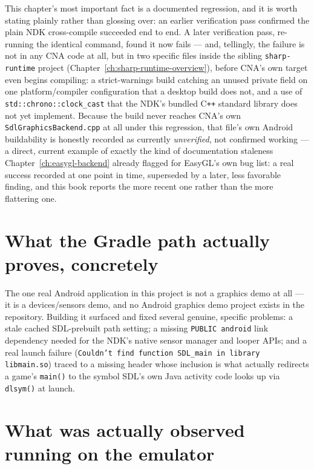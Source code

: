 This chapter's most important fact is a documented regression, and it is worth stating
plainly rather than glossing over: an earlier verification pass confirmed the plain
NDK cross-compile succeeded end to end. A later verification pass, re-running the identical
command, found it now fails --- and, tellingly, the failure is not in any CNA code at all,
but in two specific files inside the sibling \texttt{sharp-runtime} project
(Chapter~\ref{ch:sharp-runtime-overview}), before CNA's own target even begins compiling: a
strict-warnings build catching an unused private field on one platform/compiler
configuration that a desktop build does not, and a use of
\texttt{std::chrono::clock\_cast} that the NDK's bundled C\texttt{++} standard library does
not yet implement. Because the build never reaches CNA's own \texttt{SdlGraphicsBackend.cpp}
at all under this regression, that file's own Android buildability is honestly recorded as
currently \emph{unverified}, not confirmed working --- a direct, current example of exactly
the kind of documentation staleness Chapter~\ref{ch:easygl-backend} already flagged for
EasyGL's own bug list: a real success recorded at one point in time, superseded by a later,
less favorable finding, and this book reports the more recent one rather than the more
flattering one.

\section{What the Gradle path actually proves, concretely}

The one real Android application in this project is not a graphics demo at all --- it is a
devices/sensors demo, and no Android graphics demo project exists in the repository. Building
it surfaced and fixed several genuine, specific problems: a stale cached SDL-prebuilt path
setting; a missing \texttt{PUBLIC android} link dependency needed for the NDK's native sensor
manager and looper APIs; and a real launch failure (\texttt{Couldn't find function SDL\_main
in library libmain.so}) traced to a missing header whose inclusion is what actually redirects
a game's \texttt{main()} to the symbol SDL's own Java activity code looks up via
\texttt{dlsym()} at launch.

\section{What was actually observed running on the emulator}

